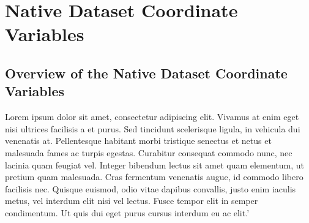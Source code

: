 \pagebreak
\section{Native Dataset Coordinate Variables}
\par\vspace{0.5cm}
\subsection{Overview of the Native Dataset Coordinate Variables}
Lorem ipsum dolor sit amet, consectetur adipiscing elit. Vivamus at enim eget nisi ultrices facilisis a et purus. Sed tincidunt scelerisque ligula, in vehicula dui venenatis at. Pellentesque habitant morbi tristique senectus et netus et malesuada fames ac turpis egestas. Curabitur consequat commodo nunc, nec lacinia quam feugiat vel. Integer bibendum lectus sit amet quam elementum, ut pretium quam malesuada. Cras fermentum venenatis augue, id commodo libero facilisis nec. Quisque euismod, odio vitae dapibus convallis, justo enim iaculis metus, vel interdum elit nisi vel lectus. Fusce tempor elit in semper condimentum. Ut quis dui eget purus cursus interdum eu ac elit.'
\par\vspace{0.5cm}


